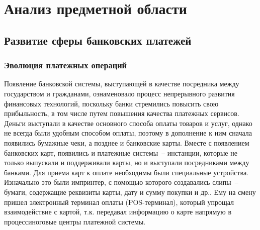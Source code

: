\newpage




\section{Анализ предметной области}

\subsection{Развитие сферы банковских платежей}

\subsubsection{Эволюция платежных операций}

Появление банковской системы, выступающей в качестве посредника между государством и гражданами, ознаменовало процесс непрерывного развития финансовых технологий, поскольку банки стремились повысить свою прибыльность, в том числе путем повышения качества платежных сервисов.
Деньги выступали в качестве основного способа оплаты товаров и услуг, однако не всегда были удобным способом оплаты, поэтому в дополнение к ним сначала появились бумажные чеки, а позднее и банковские карты.
Вместе с появлением банковских карт, появились и платежные системы~-- инстанции, которые не только выпускали и поддерживали карты, но и выступали посредниками между банками.
Для приема карт к оплате необходимы были специальные устройства.
Изначально это были импринтер, с помощью которого создавались слипы~-- бумаги, содержащие реквизиты карты, дату и сумму покупки и др..
Ему на смену пришел электронный терминал оплаты (POS-терминал), который упрощал взаимодействие с картой, т.к. передавал информацию о карте напрямую в процессиноговые центры платежной системы.

